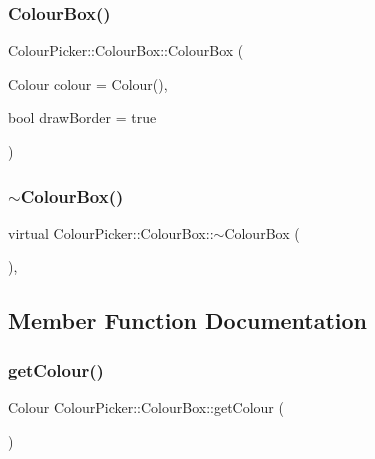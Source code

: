 \subsubsection{\texorpdfstring{Colour\+Box()}{ColourBox()}}
{\footnotesize\ttfamily Colour\+Picker\+::\+Colour\+Box\+::\+Colour\+Box (\begin{DoxyParamCaption}\item[{Colour}]{colour = {\ttfamily Colour()},  }\item[{bool}]{draw\+Border = {\ttfamily true} }\end{DoxyParamCaption})}

\mbox{\label{classColourPicker_1_1ColourBox_ad89d6748cd5e8fe912ae56289c6d86ca}} 
\subsubsection{\texorpdfstring{$\sim$\+Colour\+Box()}{~ColourBox()}}
{\footnotesize\ttfamily virtual Colour\+Picker\+::\+Colour\+Box\+::$\sim$\+Colour\+Box (\begin{DoxyParamCaption}{ }\end{DoxyParamCaption})\hspace{0.3cm}{\ttfamily [inline]}, {\ttfamily [virtual]}}



\subsection{Member Function Documentation}
\mbox{\label{classColourPicker_1_1ColourBox_a15bd1c09cc1481d35ab7f27022a7cb12}} 
\subsubsection{\texorpdfstring{get\+Colour()}{getColour()}}
{\footnotesize\ttfamily Colour Colour\+Picker\+::\+Colour\+Box\+::get\+Colour (\begin{DoxyParamCaption}{ }\end{DoxyParamCaption})}

